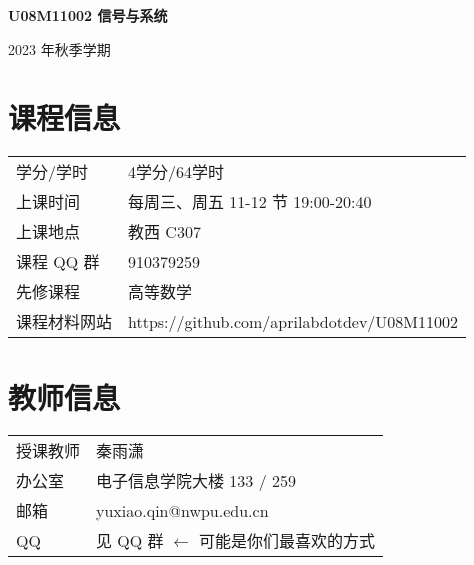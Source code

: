 \documentclass[letterpaper]{article}
\def\name{\textbf{U08M11002 信号与系统}}
\begin{document}
{\huge \name}


\vspace{0.1in}

\begin{minipage}{0.8\linewidth}
	2023 年秋季学期
\end{minipage}


\section*{\textsc{课程信息}}
\begin{tabular}{ll}
学分/学时 & 4学分/64学时 \vspace{.5em}\\
上课时间 & 	每周三、周五 11-12 节 19:00-20:40 \vspace{.5em}\\
上课地点 &	教西 C307 \vspace{.5em}\\
课程 QQ 群 & 910379259  \vspace{.5em}\\
先修课程 & 高等数学 \vspace{.5em}\\
课程材料网站 & https://github.com/aprilabdotdev/U08M11002 \vspace{.5em}\\
\end{tabular}


\section*{\textsc{教师信息}}
\begin{tabular}{ll}
授课教师 & 	秦雨潇 \vspace{.5em}\\
办公室 &	电子信息学院大楼 133 / 259 \vspace{.5em}\\
邮箱 & yuxiao.qin@nwpu.edu.cn  \vspace{.5em}\\
QQ & 见 QQ 群  $\leftarrow$ 可能是你们最喜欢的方式 \vspace{.5em}\\
\end{tabular}
\end{document}
